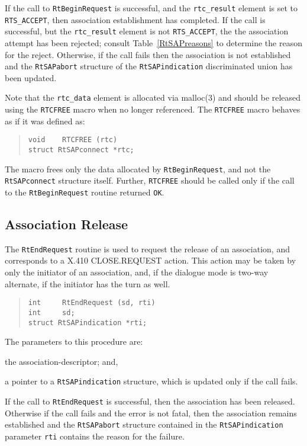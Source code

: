 If the call to \verb"RtBeginRequest" is successful,
and the \verb"rtc_result" element is set to \verb"RTS_ACCEPT",
then association establishment has completed.
If the call is successful,
but the \verb"rtc_result" element is not \verb"RTS_ACCEPT",
the the association attempt has been rejected;
consult Table~\ref{RtSAPreasons} to determine the reason for the reject.
Otherwise, if the call fails then the association is not established and
the \verb"RtSAPabort" structure of the \verb"RtSAPindication" discriminated
union has been updated.

Note that the \verb"rtc_data" element is allocated via \man malloc(3) and
should be released using the \verb"RTCFREE" macro  when no longer referenced.
The \verb"RTCFREE" macro behaves as if it was defined as:
\begin{quote}\small\begin{verbatim}
void    RTCFREE (rtc)
struct RtSAPconnect *rtc;
\end{verbatim}\end{quote}
The macro frees only the data allocated by \verb"RtBeginRequest",
and not the \verb"RtSAPconnect" structure itself.
Further,
\verb"RTCFREE" should be called only if the call to the \verb"RtBeginRequest"
routine returned \verb"OK".

\subsection       {Association Release}
The \verb"RtEndRequest" routine is used to request the release of an
association,
and corresponds to a {\sf X.410 CLOSE.REQUEST\/} action.
This action may be taken by only the initiator of an association,
and, if the dialogue mode is two-way alternate,
if the initiator has the turn as well.
\begin{quote}\small\begin{verbatim}
int     RtEndRequest (sd, rti)
int     sd;
struct RtSAPindication *rti;
\end{verbatim}\end{quote}
The parameters to this procedure are:
\begin{describe}
\item[\verb"sd":] the association-descriptor;
and,

\item[\verb"rti":] a pointer to a \verb"RtSAPindication" structure, which is
updated only if the call fails.
\end{describe}
If the call to \verb"RtEndRequest" is successful,
then the association has been released.
Otherwise if the call fails and the error is not fatal,
then the association remains established and the \verb"RtSAPabort" structure
contained in
the \verb"RtSAPindication" parameter \verb"rti" contains the reason for the
failure.

